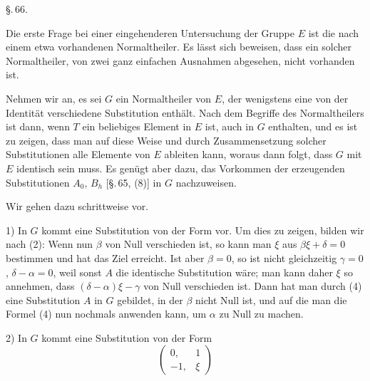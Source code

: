 
\begin{center}
\S.\,66.\\
\end{center}

Die erste Frage bei einer eingehenderen Untersuchung der Gruppe $E$ ist die nach einem etwa vorhandenen Normaltheiler. Es l\"asst sich beweisen, dass ein solcher Normaltheiler, von zwei ganz einfachen Ausnahmen abgesehen, nicht vorhanden ist.

Nehmen wir an, es sei $G$ ein Normaltheiler von $E$, der wenigstens eine von der Identit\"at verschiedene Substitution
enth\"alt. Nach dem Begriffe des Normaltheilers ist dann, wenn $T$ ein beliebiges Element in $E$ ist,
auch in $G$ enthalten, und es ist zu zeigen, dass man auf diese Weise und durch Zusammensetzung solcher Substitutionen alle Elemente von $E$ ableiten kann, woraus dann folgt, dass $G$ mit $E$ identisch sein muss. Es gen\"ugt aber dazu, das Vorkommen der erzeugenden Substitutionen $A_0$, $B_h$ [\S.\,65, (8)] in $G$ nachzuweisen.

Wir gehen dazu schrittweise vor.

1) In $G$ kommt eine Substitution von der Form
vor. Um dies zu zeigen, bilden wir nach (2):
Wenn nun $\beta$ von Null verschieden ist, so kann man $\xi$ aus $\beta\xi+\delta=0$ bestimmen und hat das Ziel erreicht. Ist aber $\beta=0$, so ist nicht gleichzeitig $\gamma=0$, $\delta-\alpha=0$, weil sonst $A$ die identische Substitution w\"are; man kann daher $\xi$ so annehmen, dass $(\delta-\alpha)\xi-\gamma$ von Null verschieden ist. Dann hat man durch (4) eine Substitution $A$ in $G$ gebildet, in der $\beta$ nicht Null ist, und auf die man die Formel (4) nun nochmals anwenden kann, um $\alpha$ zu Null zu machen.

2) In $G$ kommt eine Substitution von der Form
\[
\begin{pmatrix} 0, & 1 \\ -1, & \xi \end{pmatrix}
\]
